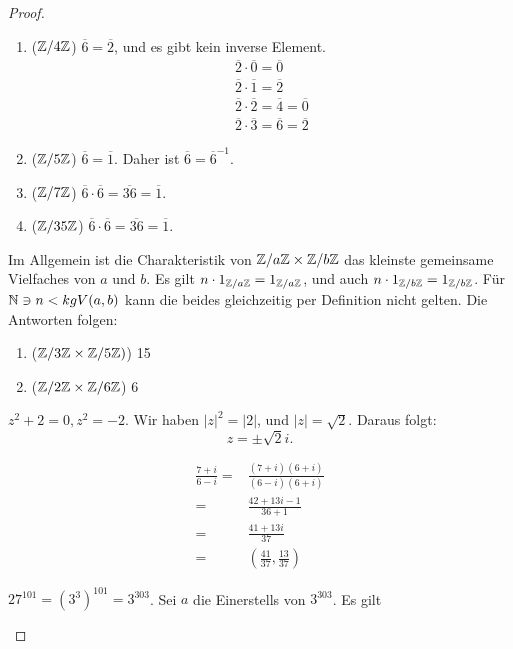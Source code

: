 \begin{proof}
	\begin{parts}
	\item 
		\begin{enumerate}[label=(\roman*)]
			\item ($\mathbb{Z} / 4\mathbb{Z}$) $\overline{6}=\overline{2}$, und es gibt kein inverse Element.
				\begin{gather*}
					\overline{2}\cdot \overline{0}=\overline{0}\\
					\overline{2}\cdot \overline{1}=\overline{2}\\
					\overline{2}\cdot \overline{2}=\overline{4}=\overline{0}\\
					\overline{2}\cdot \overline{3}=\overline{6}=\overline{2}
				\end{gather*}
			\item ($\mathbb{Z} / 5\mathbb{Z}$) $\overline{6}=\overline{1}$. Daher ist $\overline{6}=\overline{6}^{-1}$.
			\item ($\mathbb{Z} / 7\mathbb{Z}$) $\overline{6}\cdot \overline{6}=\overline{36}=\overline{1}$.
			\item ($\mathbb{Z} / 35 \mathbb{Z}$) $\overline{6}\cdot \overline{6}=\overline{36}=\overline{1}$.
		\end{enumerate}
	\item Im Allgemein ist die Charakteristik von $\mathbb{Z} / a\mathbb{Z}\times \mathbb{Z} / b\mathbb{Z}$ das kleinste gemeinsame Vielfaches von $a$ und $b$. Es gilt $n\cdot 1_{\mathbb{Z} / a\mathbb{Z}}=1_{\mathbb{Z} / a \mathbb{Z}}$, und auch $n \cdot 1_{\mathbb{Z} / b\mathbb{Z}}=1_{\mathbb{Z} / b \mathbb{Z}}$. F\"{u}r $\mathbb{N} \ni n < kgV(a,b)$ kann die beides gleichzeitig per Definition nicht gelten. Die Antworten folgen: 
		\begin{enumerate}[label=(\roman*)]
			\item ($\mathbb{Z} / 3\mathbb{Z} \times \mathbb{Z} / 5\mathbb{Z})$) 15
			\item ($\mathbb{Z} / 2\mathbb{Z} \times \mathbb{Z} / 6\mathbb{Z}$) 6
		\end{enumerate}
	\item $z^2+2=0, z^2=-2$. Wir haben $|z|^2=|2|$, und $|z|=\sqrt{2} $. Daraus folgt:
		\[
			z=\pm\sqrt{2}i
		.\] 
	\item 
		\begin{align*}
			\frac{7+i}{6-i}=&\frac{(7+i)(6+i)}{(6-i)(6+i)}\\
			=& \frac{42+13i-1}{36+1}\\
			=& \frac{41+13i}{37}\\
			=&\left( \frac{41}{37},\frac{13}{37} \right) 
		\end{align*}
	\item $27^{101}=(3^3)^{101}=3^{303}$. Sei $a$ die Einerstells von $3^{303}$. Es gilt

\end{parts}
\end{proof}
